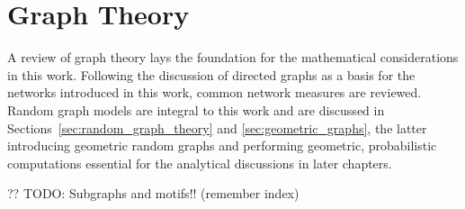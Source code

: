 \chapter{Graph Theory}\label{ch:Graph_theory} 

A review of graph theory lays the foundation for the mathematical
considerations in this work. Following the discussion of directed
graphs as a basis for the networks introduced in this work, common network
measures are reviewed. Random graph models are integral to this work and are
discussed in Sections~\ref{sec:random_graph_theory} and
\ref{sec:geometric_graphs}, the latter introducing geometric random
graphs and performing geometric, probabilistic computations essential
for the analytical discussions in later chapters. 











?? TODO: Subgraphs and motifs!! (remember index)












% 





